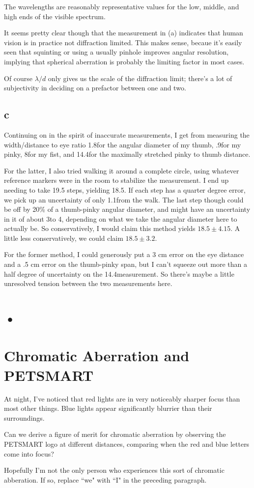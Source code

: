 \documentclass[12pt]{article}
\begin{document}
The wavelengths are reasonably representative values for the low, middle, and high ends of the visible spectrum.


It seems pretty clear though that the measurement in (a) indicates that human vision is in practice not diffraction limited. This makes sense, becaue it's easily seen that squinting or using a usually pinhole improves angular resolution, implying that spherical aberration is probably the limiting factor in most cases.


Of course \(\lambda/d\) only gives us the scale of the diffraction limit; there's a lot of subjectivity in deciding on a prefactor between one and two.

\subsection*{c}

Continuing on in the spirit of inaccurate measurements, I get from measuring the width/distance to eye ratio 1.8\degree for the angular diameter of my thumb, .9\degree for my pinky, 8\degree for my fist, and 14.4\degree for the maximally stretched pinky to thumb distance.

For the latter, I also tried walking it around a complete circle, using whatever reference markers were in the room to stabilize the measurement. I end up needing to take 19.5 steps, yielding 18.5\degree. If each step has a quarter degree error, we pick up an uncertainty of only 1.1\degree from the walk. The last step though could be off by 20\% of a thumb-pinky angular diameter, and might have an uncertainty in it of about 3\degree to 4\degree, depending on what we take the angular diameter here to actually be. So conservatively, I would claim this method yields \(18.5\pm 4.15\)\degree. A little less conservatively, we could claim \(18.5\pm 3.2\)\degree. 

For the former method, I could generously put a 3 cm error on the eye distance and a .5 cm error on the thumb-pinky span, but I can't squeeze out more than a half degree of uncertainty on the 14.4\degree measurement. So there's maybe a little unresolved tension between the two measurements here.

\section{•}

\section{Chromatic Aberration and PETSMART}

At night, I've noticed that red lights are in very noticeably sharper focus than most other things. Blue lights appear significantly blurrier than their surroundings.

Can we derive a figure of merit for chromatic aberration by observing the PETSMART logo at different distances, comparing when the red and blue letters come into focus?

Hopefully I'm not the only person who experiences this sort of chromatic abberation. If so, replace ``we" with ``I" in the preceding paragraph.
\end{document}
